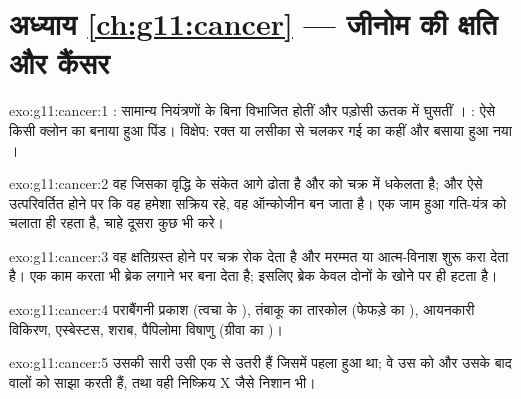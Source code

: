 \section*{अध्याय \ref{ch:g11:cancer} --- जीनोम की क्षति और कैंसर}

\begin{solution}{exo:g11:cancer:1}
: सामान्य नियंत्रणों के बिना विभाजित होतीं और पड़ोसी ऊतक में घुसतीं
। : ऐसे किसी क्लोन का बनाया हुआ पिंड। विक्षेप: रक्त या लसीका
से चलकर गई  का कहीं और बसाया हुआ नया ।
\end{solution}

\begin{solution}{exo:g11:cancer:2}
वह  जिसका  वृद्धि के संकेत आगे ढोता है और  को चक्र में
धकेलता है; और ऐसे उत्परिवर्तित होने पर कि वह  हमेशा सक्रिय रहे, वह
ऑन्कोजीन बन जाता है। एक जाम हुआ गति-यंत्र  को चलाता ही रहता है, चाहे
दूसरा  कुछ भी करे।
\end{solution}

\begin{solution}{exo:g11:cancer:3}
वह  क्षतिग्रस्त होने पर चक्र रोक देता है और मरम्मत या आत्म-विनाश शुरू
करा देता है। एक काम करता  भी ब्रेक लगाने भर  बना देता है;
इसलिए ब्रेक केवल दोनों के खोने पर ही हटता है।
\end{solution}

\begin{solution}{exo:g11:cancer:4}
पराबैंगनी प्रकाश (त्वचा के ), तंबाकू का तारकोल (फेफड़े का ),
आयनकारी विकिरण, एस्बेस्टस, शराब, पैपिलोमा विषाणु (ग्रीवा का )।
\end{solution}

\begin{solution}{exo:g11:cancer:5}
उसकी सारी  उसी एक  से उतरी हैं जिसमें पहला  हुआ
था; वे उस  को और उसके बाद वालों को साझा करती हैं, तथा वही
निष्क्रिय X  जैसे निशान भी।
\end{solution}

